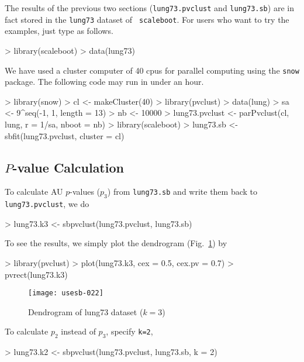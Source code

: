 \documentclass[a4paper]{amsart}
\begin{document}
The results of the previous two sections ({\tt lung73.pvclust} and
{\tt lung73.sb}) are in fact stored in the {\tt lung73} dataset of {\tt
scaleboot}. For users who want to try the examples, just type as follows.
\begin{Schunk}
\begin{Sinput}
> library(scaleboot)
> data(lung73)
\end{Sinput}
\end{Schunk}

We have used a cluster computer of 40 cpus for parallel
computing using the {\tt snow} package.
The following code may run in under an hour.
\begin{Schunk}
\begin{Sinput}
> library(snow)
> cl <- makeCluster(40)
> library(pvclust)
> data(lung)
> sa <- 9^seq(-1, 1, length = 13)
> nb <- 10000
> lung73.pvclust <- parPvclust(cl, lung, r = 1/sa, nboot = nb)
> library(scaleboot)
> lung73.sb <- sbfit(lung73.pvclust, cluster = cl)
\end{Sinput}
\end{Schunk}

\subsection{$P$-value Calculation}

To calculate AU $p$-values ($p_3$) from {\tt lung73.sb} and write them
back to {\tt lung73.pvclust}, we do
\begin{Schunk}
\begin{Sinput}
> lung73.k3 <- sbpvclust(lung73.pvclust, lung73.sb)
\end{Sinput}
\end{Schunk}
To see the results, we simply plot the dendrogram
(Fig.~\ref{fig:lung73tree}) by
\begin{Schunk}
\begin{Sinput}
> library(pvclust)
> plot(lung73.k3, cex = 0.5, cex.pv = 0.7)
> pvrect(lung73.k3)
\end{Sinput}
\end{Schunk}
\begin{figure}
\begin{center}
\texttt{[image: usesb-022]}
\caption{Dendrogram of lung73 dataset ($k=3$)}\label{fig:lung73tree}
\end{center}
\end{figure}
To calculate $p_2$ instead of $p_3$, specify {\tt k=2},
\begin{Schunk}
\begin{Sinput}
> lung73.k2 <- sbpvclust(lung73.pvclust, lung73.sb, k = 2)
\end{Sinput}
\end{Schunk}
\end{document}
